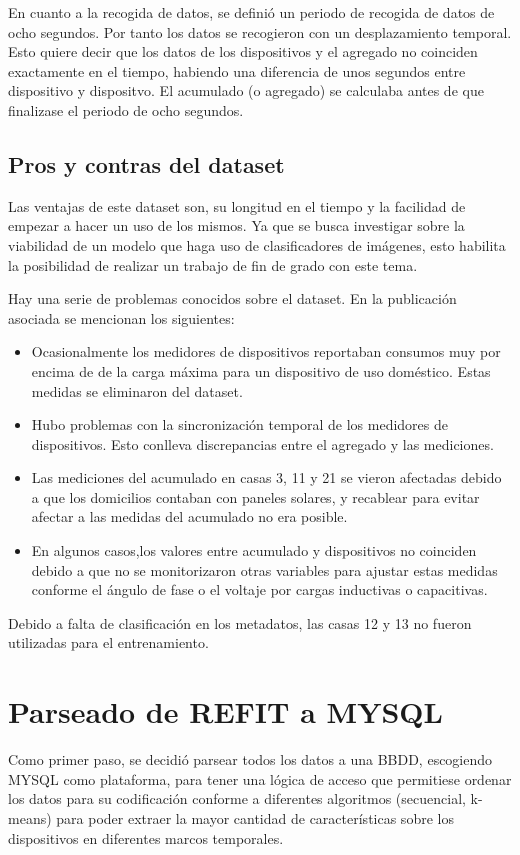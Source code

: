 En cuanto a la recogida de datos, se definió un periodo de recogida de datos de ocho segundos. Por tanto los datos se recogieron con un desplazamiento temporal. Esto quiere decir que los datos de los dispositivos y el agregado no coinciden exactamente en el tiempo, habiendo una diferencia de unos segundos entre dispositivo y dispositvo. El acumulado (o agregado) se calculaba antes de que finalizase el periodo de ocho segundos.


\subsection{Pros y contras del dataset}

Las ventajas de este dataset son, su longitud en el tiempo y la facilidad de empezar a hacer un uso de los mismos. Ya que se busca investigar sobre la viabilidad de un modelo que haga uso de clasificadores de imágenes, esto habilita la posibilidad de realizar un trabajo de fin de grado con este tema. 

Hay una serie de problemas conocidos sobre el dataset. En la publicación asociada se mencionan los siguientes:
\begin{itemize}
    \item Ocasionalmente los medidores de dispositivos reportaban consumos muy por encima de de la carga máxima para un dispositivo de uso doméstico. Estas medidas se eliminaron del dataset.
    \item Hubo problemas con la sincronización temporal de los medidores de dispositivos. Esto conlleva discrepancias entre el agregado y las mediciones.
    \item Las mediciones del acumulado en casas 3, 11 y 21 se vieron afectadas debido a que los domicilios contaban con paneles solares, y recablear para evitar afectar a las medidas del acumulado no era posible.
    \item En algunos casos,los valores entre acumulado y dispositivos no coinciden debido a que no se monitorizaron otras variables para ajustar estas medidas conforme el ángulo de fase o el voltaje por cargas inductivas o capacitivas.
\end{itemize}

Debido a falta de clasificación en los metadatos, las casas 12 y 13 no fueron utilizadas para el entrenamiento.

\section{Parseado de REFIT a MYSQL}
Como primer paso, se decidió parsear todos los datos a una BBDD, escogiendo MYSQL como plataforma, para tener una lógica de acceso que permitiese ordenar los datos para su codificación conforme a diferentes algoritmos (secuencial, k-means) para poder extraer la mayor cantidad de características sobre los dispositivos en diferentes marcos temporales.

